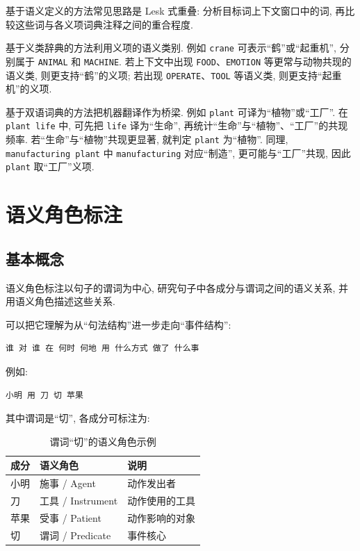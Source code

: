 基于语义定义的方法常见思路是 Lesk 式重叠:
分析目标词上下文窗口中的词,
再比较这些词与各义项词典注释之间的重合程度.

基于义类辞典的方法利用义项的语义类别.
例如 \texttt{crane} 可表示“鹤”或“起重机”,
分别属于 \texttt{ANIMAL} 和 \texttt{MACHINE}.
若上下文中出现 \texttt{FOOD}、\texttt{EMOTION} 等更常与动物共现的语义类,
则更支持“鹤”的义项;
若出现 \texttt{OPERATE}、\texttt{TOOL} 等语义类, 则更支持“起重机”的义项.

基于双语词典的方法把机器翻译作为桥梁.
例如 \texttt{plant} 可译为“植物”或“工厂”.
在 \texttt{plant life} 中, 可先把 \texttt{life} 译为“生命”,
再统计“生命”与“植物”、“工厂”的共现频率.
若“生命”与“植物”共现更显著, 就判定 \texttt{plant} 为“植物”.
同理, \texttt{manufacturing plant} 中 \texttt{manufacturing} 对应“制造”,
更可能与“工厂”共现, 因此 \texttt{plant} 取“工厂”义项.

\section{语义角色标注}


\subsection{基本概念}


语义角色标注以句子的谓词为中心,
研究句子中各成分与谓词之间的语义关系,
并用语义角色描述这些关系.

可以把它理解为从“句法结构”进一步走向“事件结构”:

\begin{Verbatim}[breaklines=true,breakanywhere=true,fontsize=\small]
谁 对 谁 在 何时 何地 用 什么方式 做了 什么事
\end{Verbatim}

例如:

\begin{Verbatim}[breaklines=true,breakanywhere=true,fontsize=\small]
小明 用 刀 切 苹果
\end{Verbatim}

其中谓词是“切”, 各成分可标注为:

\begin{table}[H]
\centering
\begingroup
\setlength{\tabcolsep}{2pt}
\small
\caption{谓词“切”的语义角色示例}
\begin{tabular}{|p{}|p{}|p{}|}
\hline
成分 & 语义角色 & 说明 \\ \hline
小明 & 施事 / Agent & 动作发出者 \\ \hline
刀 & 工具 / Instrument & 动作使用的工具 \\ \hline
苹果 & 受事 / Patient & 动作影响的对象 \\ \hline
切 & 谓词 / Predicate & 事件核心 \\ \hline
\end{tabular}
\endgroup
\end{table}

